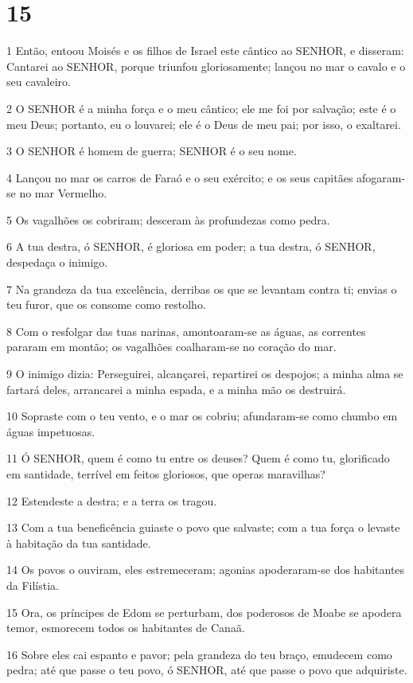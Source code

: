 \chapter{15}

\par 1 Então, entoou Moisés e os filhos de Israel este cântico ao SENHOR, e disseram: Cantarei ao SENHOR, porque triunfou gloriosamente; lançou no mar o cavalo e o seu cavaleiro.
\par 2 O SENHOR é a minha força e o meu cântico; ele me foi por salvação; este é o meu Deus; portanto, eu o louvarei; ele é o Deus de meu pai; por isso, o exaltarei.
\par 3 O SENHOR é homem de guerra; SENHOR é o seu nome.
\par 4 Lançou no mar os carros de Faraó e o seu exército; e os seus capitães afogaram-se no mar Vermelho.
\par 5 Os vagalhões os cobriram; desceram às profundezas como pedra.
\par 6 A tua destra, ó SENHOR, é gloriosa em poder; a tua destra, ó SENHOR, despedaça o inimigo.
\par 7 Na grandeza da tua excelência, derribas os que se levantam contra ti; envias o teu furor, que os consome como restolho.
\par 8 Com o resfolgar das tuas narinas, amontoaram-se as águas, as correntes pararam em montão; os vagalhões coalharam-se no coração do mar.
\par 9 O inimigo dizia: Perseguirei, alcançarei, repartirei os despojos; a minha alma se fartará deles, arrancarei a minha espada, e a minha mão os destruirá.
\par 10 Sopraste com o teu vento, e o mar os cobriu; afundaram-se como chumbo em águas impetuosas.
\par 11 Ó SENHOR, quem é como tu entre os deuses? Quem é como tu, glorificado em santidade, terrível em feitos gloriosos, que operas maravilhas?
\par 12 Estendeste a destra; e a terra os tragou.
\par 13 Com a tua beneficência guiaste o povo que salvaste; com a tua força o levaste à habitação da tua santidade.
\par 14 Os povos o ouviram, eles estremeceram; agonias apoderaram-se dos habitantes da Filístia.
\par 15 Ora, os príncipes de Edom se perturbam, dos poderosos de Moabe se apodera temor, esmorecem todos os habitantes de Canaã.
\par 16 Sobre eles cai espanto e pavor; pela grandeza do teu braço, emudecem como pedra; até que passe o teu povo, ó SENHOR, até que passe o povo que adquiriste.
